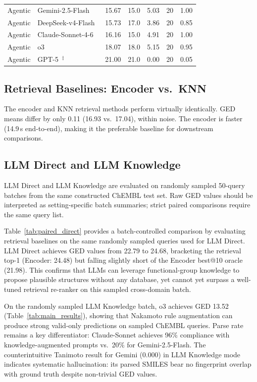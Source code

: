 \documentclass[conference]{IEEEtran}
\begin{document}
\begin{table}[t]
\begin{tabular}{llrrrrr}
Agentic & Gemini-2.5-Flash~\cite{gemini2-5} & 15.67 & 15.0 & 5.03 & 20 & 1.00\\
Agentic & DeepSeek-v4-Flash~\cite{deepseek2026deepseek} & 15.73 & 17.0 & 3.86 & 20 & 0.85\\
Agentic & Claude-Sonnet-4-6~\cite{claude-sonnet-4-6} & 16.16 & 15.0 & 4.91 & 20 & 1.00\\
Agentic & o3~\cite{o3_and_o4-mini} & 18.07 & 18.0 & 5.15 & 20 & 0.95\\
Agentic & GPT-5~\cite{gpt-5}$^\ddagger$ & 21.00 & 21.0 & 0.00 & 20 & 0.05\\
\bottomrule
\end{tabular}
\end{table}

\subsection{Retrieval Baselines: Encoder vs.\ KNN}

The encoder and KNN retrieval methods perform virtually identically. GED means differ by only 0.11 (16.93 vs.\ 17.04), within noise. The encoder is faster (14.9\,s end-to-end), making it the preferable baseline for downstream comparisons.

\subsection{LLM Direct and LLM Knowledge}

LLM Direct and LLM Knowledge are evaluated on randomly sampled 50-query batches from the same constructed ChEMBL test set. Raw GED values should be interpreted as setting-specific batch summaries; strict paired comparisons require the same query list.

Table~\ref{tab:paired_direct} provides a batch-controlled comparison by evaluating retrieval baselines on the same randomly sampled queries used for LLM Direct. LLM Direct achieves GED values from 22.79 to 24.68, bracketing the retrieval top-1 (Encoder: 24.48) but falling slightly short of the Encoder best@10 oracle (21.98). This confirms that LLMs can leverage functional-group knowledge to propose plausible structures without any database, yet cannot yet surpass a well-tuned retrieval re-ranker on this sampled cross-domain batch.

On the randomly sampled LLM Knowledge batch, o3 achieves GED 13.52 (Table~\ref{tab:main_results}), showing that Nakamoto rule augmentation can produce strong valid-only predictions on sampled ChEMBL queries. Parse rate remains a key differentiator: Claude-Sonnet achieves 96\% compliance with knowledge-augmented prompts vs.\ 20\% for Gemini-2.5-Flash. The counterintuitive Tanimoto result for Gemini (0.000) in LLM Knowledge mode indicates systematic hallucination: its parsed SMILES bear no fingerprint overlap with ground truth despite non-trivial GED values.
\end{document}
